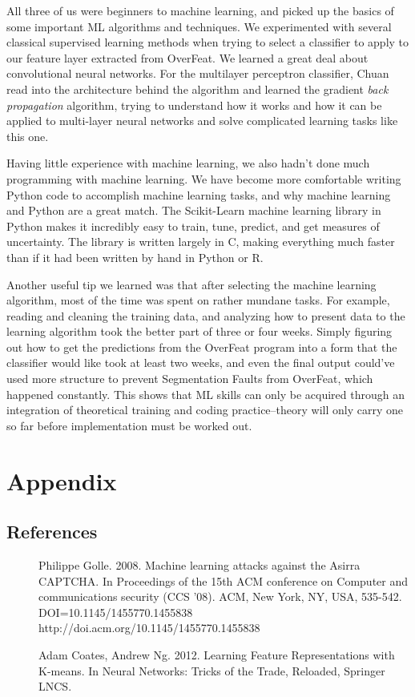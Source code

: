\documentclass[12pt]{article}
\begin{document}
All three of us were beginners to machine learning, and picked up the basics of some important ML algorithms and techniques. We experimented with several classical supervised learning methods when trying to select a classifier to apply to our feature layer extracted from OverFeat.  We learned a great deal about convolutional neural networks. For the multilayer perceptron classifier, Chuan read into the architecture behind the algorithm and learned the gradient \emph{back propagation} algorithm, trying to understand how it works and how it can be applied to multi-layer neural networks and solve complicated learning tasks like this one.

Having little experience with machine learning, we also hadn't done much programming with machine learning. We have become more comfortable writing Python code to accomplish machine learning tasks, and why machine learning and Python are a great match. The Scikit-Learn machine learning library in Python makes it incredibly easy to train, tune, predict, and get measures of uncertainty. The library is written largely in C, making everything much faster than if it had been written by hand in Python or R.

Another useful tip we learned was that after selecting the machine learning algorithm, most of the time was spent on rather mundane tasks. For example, reading and cleaning the training data, and analyzing how to present data to the learning algorithm took the better part of three or four weeks. Simply figuring out how to get the predictions from the OverFeat program into a form that the classifier would like took at least two weeks, and even the final output could've used more structure to prevent Segmentation Faults from OverFeat, which happened constantly. This shows that ML skills can only be acquired through an integration of theoretical training and coding practice--theory will only carry one so far before implementation must be worked out.

\section{Appendix}
\subsection{References}
\begin{description}
\item[] Philippe Golle. 2008. Machine learning attacks against the Asirra CAPTCHA. In Proceedings of the 15th ACM conference on Computer and communications security (CCS '08). ACM, New York, NY, USA, 535-542. DOI=10.1145/1455770.1455838 http://doi.acm.org/10.1145/1455770.1455838
\item[] Adam Coates, Andrew Ng. 2012. Learning Feature Representations with K-means. In Neural Networks: Tricks of the Trade, Reloaded, Springer LNCS.
\end{description} 
\end{document}
